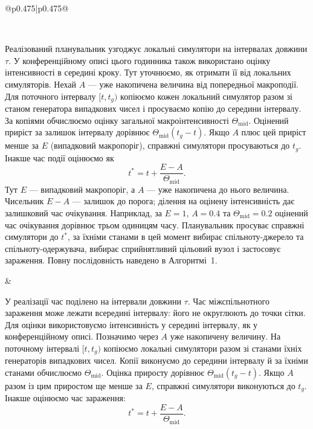 ﻿\documentclass[11pt]{article}
\begin{document}
\begin{longtable}{@{}p{0.475\textwidth}|p{0.475\textwidth}@{}}
\begin{minipage}[t]{\linewidth}
\end{minipage} \\[5mm]
\begin{minipage}[t]{\linewidth}
Реалізований планувальник узгоджує локальні симулятори на інтервалах довжини $\tau$. У конференційному описі цього годинника також використано оцінку інтенсивності в середині кроку. Тут уточнюємо, як отримати її від локальних симуляторів. Нехай $A$ --- уже накопичена величина від попередньої макроподії. Для поточного інтервалу $[t,t_g)$ копіюємо кожен локальний симулятор разом зі станом генератора випадкових чисел і просуваємо копію до середини інтервалу. За копіями обчислюємо оцінку загальної макроінтенсивності $\Theta_{\mathrm{mid}}$. Оцінений приріст за залишок інтервалу дорівнює $\Theta_{\mathrm{mid}}(t_g-t)$. Якщо $A$ плюс цей приріст менше за $E$ (випадковий макропоріг), справжні симулятори просуваються до $t_g$. Інакше час події оцінюємо як
\begin{equation*}t^\ast=t+\frac{E-A}{\Theta_{\mathrm{mid}}}.\tag{6}
\end{equation*}
Тут $E$ --- випадковий макропоріг, а $A$ --- уже накопичена до нього величина. Чисельник $E-A$ --- залишок до порога; ділення на оцінену інтенсивність дає залишковий час очікування. Наприклад, за $E=1$, $A=0.4$ та $\Theta_{\mathrm{mid}}=0.2$ оцінений час очікування дорівнює трьом одиницям часу. Планувальник просуває справжні симулятори до $t^\ast$, за їхніми станами в цей момент вибирає спільноту-джерело та спільноту-одержувача, вибирає сприйнятливий цільовий вузол і застосовує зараження. Повну послідовність наведено в Алгоритмі~1.
\end{minipage} &
\begin{minipage}[t]{\linewidth}
У реалізації час поділено на інтервали довжини $\tau$. Час міжспільнотного зараження може лежати всередині інтервалу: його не округлюють до точки сітки. Для оцінки використовуємо інтенсивність у середині інтервалу, як у конференційному описі. Позначимо через $A$ уже накопичену величину. На поточному інтервалі $[t,t_g)$ копіюємо локальні симулятори разом зі станами їхніх генераторів випадкових чисел. Копії виконуємо до середини інтервалу й за їхніми станами обчислюємо $\Theta_{\mathrm{mid}}$. Оцінка приросту дорівнює $\Theta_{\mathrm{mid}}(t_g-t)$. Якщо $A$ разом із цим приростом ще менше за $E$, справжні симулятори виконуються до $t_g$. Інакше оцінюємо час зараження:
\begin{equation*}t^\ast=t+\frac{E-A}{\Theta_{\mathrm{mid}}}.\tag{6}
\end{equation*}

\end{minipage}
\end{longtable}
\end{document}
